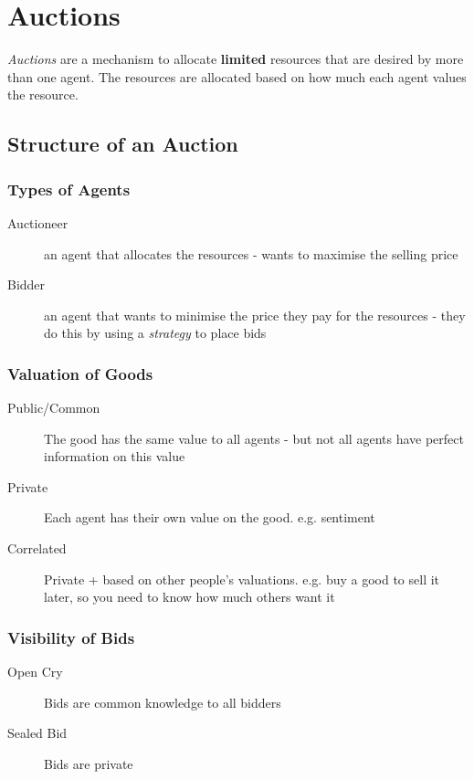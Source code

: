\section{Auctions}
\emph{Auctions} are a mechanism to allocate \textbf{limited} resources that are desired by more than one agent. The resources are allocated based on how much each agent values the resource.

\subsection{Structure of an Auction}
\subsubsection{Types of Agents}
\begin{description}
    \item[Auctioneer] an agent that allocates the resources - wants to maximise the selling price
    \item[Bidder] an agent that wants to minimise the price they pay for the resources - they do this by using a \emph{strategy} to place bids
\end{description}

\subsubsection{Valuation of Goods}
\begin{description}
    \item[Public/Common] The good has the same value to all agents - but not all agents have perfect information on this value
    \item[Private] Each agent has their own value on the good. e.g. sentiment
    \item[Correlated] Private + based on other people's valuations. e.g. buy a good to sell it later, so you need to know how much others want it
\end{description}

\subsubsection{Visibility of Bids}
\begin{description}
    \item[Open Cry] Bids are common knowledge to all bidders
    \item[Sealed Bid] Bids are private
\end{description}

